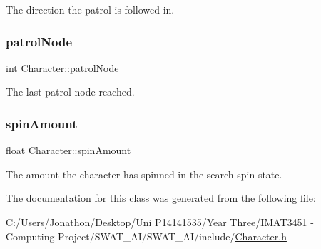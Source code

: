 The direction the patrol is followed in. 

\mbox{\label{class_character_ae7e67233ca5f5577676cd83f5d2a847f}} 
\subsubsection{\texorpdfstring{patrol\+Node}{patrolNode}}
{\footnotesize\ttfamily int Character\+::patrol\+Node\hspace{0.3cm}{\ttfamily [private]}}



The last patrol node reached. 

\mbox{\label{class_character_a0b30a626fb45ab6539d983ef51c19958}} 
\subsubsection{\texorpdfstring{spin\+Amount}{spinAmount}}
{\footnotesize\ttfamily float Character\+::spin\+Amount\hspace{0.3cm}{\ttfamily [private]}}



The amount the character has spinned in the search spin state. 



The documentation for this class was generated from the following file\+:\begin{DoxyCompactItemize}
\item 
C\+:/\+Users/\+Jonathon/\+Desktop/\+Uni P14141535/\+Year Three/\+I\+M\+A\+T3451 -\/ Computing Project/\+S\+W\+A\+T\+\_\+\+A\+I/\+S\+W\+A\+T\+\_\+\+A\+I/include/\hyperlink{_character_8h}{Character.\+h}\end{DoxyCompactItemize}
